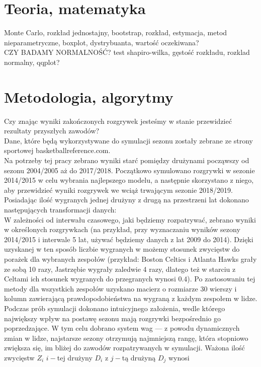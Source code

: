 \documentclass[inzynierska]{pwr_wmat_praca_dyplomowa}
\theoremstyle{plain}
\numberwithin{theorem}{chapter}
\theoremstyle{definition}
\numberwithin{theorem}{chapter}
\begin{document}
\chapter{Teoria, matematyka}
Monte Carlo, rozkład jednostajny, bootstrap, rozkład, estymacja, metod nieparametryczne, boxplot, dystrybuanta, wartość oczekiwana?\\
CZY BADAMY NORMALNOŚĆ? test shapiro-wilka, gęstość rozkładu, rozklad normalny, qqplot?

\chapter{Metodologia, algorytmy}
Czy znając wyniki zakończonych rozgrywek jesteśmy w stanie przewidzieć rezultaty przyszłych zawodów?
\\
Dane, które będą wykorzystywane do symulacji sezonu zostały zebrane ze strony sportowej basketballreference.com.
\\
Na potrzeby tej pracy zebrano wyniki starć pomiędzy drużynami począwszy od sezonu 2004/2005 aż do 2017/2018. Początkowo symulowano rozgrywki w sezonie 2014/2015 w celu wybrania najlepszego modelu, a następnie skorzystano z niego, aby przewidzieć wyniki rozgrywek we wciąż trwającym sezonie 2018/2019.
Posiadając ilość wygranych jednej drużyny z drugą na przestrzeni lat dokonano następujących transformacji danych:
\\
W zależności od interwału czasowego, jaki będziemy rozpatrywać, zebrano wyniki w określonych rozgrywkach (na przykład, przy wyznaczaniu wyników sezony 2014/2015 i interwale 5 lat, używać będziemy danych z lat 2009 do 2014). Dzięki uzyskanej w ten sposób liczbie wygranych w możemy stosunek zwycięstw do porażek dla wybranych zespołów (przykład: Boston Celtics i Atlanta Hawks grały ze sobą 10 razy, Jastrzębie wygrały zaledwie 4 razy, dlatego też w starciu z Celtami ich stosunek wygranych do przegranych wynosi $0.4$). Po zastosowaniu tej metody dla wszystkich zespołów uzyskano macierz o rozmiarze 30 wierszy i kolumn zawierającą prawdopodobieństwa na wygraną z każdym zespołem w lidze.
\\
Podczas prób symulacji dokonano intuicyjnego założenia, wedle którego największy wpływ na postawę sezonu mają rozgrywki bezpośrednio go poprzedzające. W tym celu dobrano system wag --- z powodu dynamicznych zmian w lidze, najstarsze sezony otrzymują najmniejszą rangę, która stopniowo zwiększa się, im bliżej do zawodów rozpatrywanych w symulacji. Ważona ilość zwycięstw $Z_i$ $i-$tej drużyny $D_i$ z $j-$tą drużyną $D_j$ wynosi
\end{document}
